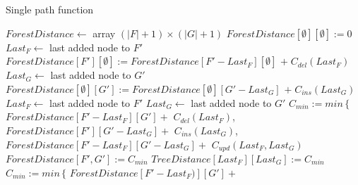 \begin{algorithm}
  \caption{Single path function}
  \label{alg:spf}
  \begin{algorithmic}[1]
          \State {}
        \EndFor
      \Else
          \State {}
        \EndFor
      \EndIf
    \EndProcedure
  \item[]
    \State $ForestDistance \gets$ array $(|F| + 1) \times (|G| + 1)$
      \State $ForestDistance[\emptyset][\emptyset] := 0$
        \State $Last_{F} \gets$ last added node to $F'$
        \State $ForestDistance[F'][\emptyset] := ForestDistance[F' - Last_{F}][\emptyset]$
        \Indent
          \State $+ \; C_{del}(Last_{F})$
        \EndIndent
      \EndFor
        \State $Last_{G} \gets$ last added node to $G'$
        \State $ForestDistance[\emptyset][G'] := ForestDistance[\emptyset][G' - Last_{G}]$
        \Indent
          \State $+ \; C_{ins}(Last_{G})$
        \EndIndent
      \EndFor
          \State $Last_{F} \gets$ last added node to $F'$
          \State $Last_{G} \gets$ last added node to $G'$
          \label{alg:spf:iftrees}
            \State $C_{min} := min \, \{$
            \Indent
            \State $ForestDistance[F' - Last_{F}][G'] +$
              \Indent
                \State $C_{del}(Last_{F})$,
              \EndIndent
              \State $ForestDistance[F'][G' - Last_{G}] +$
              \Indent
                \State $C_{ins}(Last_{G})$,
              \EndIndent
              \State $ForestDistance[F' - Last_{F}][G' - Last_{G}] +$
              \Indent
                \State $C_{upd}(Last_{F}, Last_{G})$
              \EndIndent
            \EndIndent
            \State $ForestDistance[F', G'] := C_{min}$
            \State $TreeDistance[Last_{F}][Last_{G}] := C_{min}$
          \Else
          \label{alg:spf:ifforests}
            \State $C_{min} := min \, \{$
            \Indent
              \State $ForestDistance[F' - Last_{F})][G'] +$

\end{algorithmic}
\end{algorithm}
